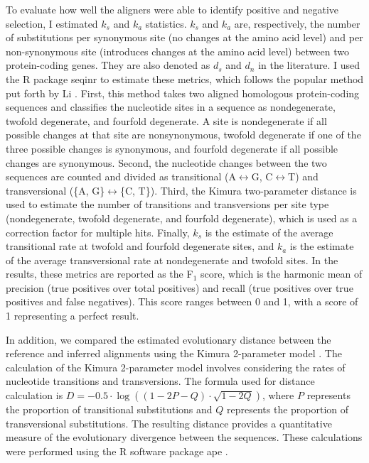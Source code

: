 \documentclass[12pt,letterpaper]{article}
\begin{document}
To evaluate how well the aligners were able to identify positive and negative selection, I estimated $k_s$ and $k_a$ statistics. $k_s$ and $k_a$ are, respectively, the number of substitutions per synonymous site (no changes at the amino acid level) and per non-synonymous site (introduces changes at the amino acid level) between two protein-coding genes. They are also denoted as $d_s$ and $d_n$ in the literature. I used the R package seqinr \citep{seqinr} to estimate these metrics, which follows the popular method put forth by Li \citep{ka_ks_li_1993}. First, this method takes two aligned homologous protein-coding sequences and classifies the nucleotide sites in a sequence as nondegenerate, twofold degenerate, and fourfold degenerate. A site is nondegenerate if all possible changes at that site are nonsynonymous, twofold degenerate if one of the three possible changes is synonymous, and fourfold degenerate if all possible changes are synonymous. Second, the nucleotide changes between the two sequences are counted and divided as transitional (A$\leftrightarrow$G, C$\leftrightarrow$T) and transversional (\{A, G\}$\leftrightarrow$\{C, T\}). Third, the Kimura two-parameter distance \citep{kimura1980simple} is used to estimate the number of transitions and transversions per site type (nondegenerate, twofold degenerate, and fourfold degenerate), which is used as a correction factor for multiple hits. Finally, $k_s$ is the estimate of the average transitional rate at twofold and fourfold degenerate sites, and $k_a$ is the estimate of the average transversional rate at nondegenerate and twofold sites. In the results, these metrics are reported as the F$_1$ score, which is the harmonic mean of precision (true positives over total positives) and recall (true positives over true positives and false negatives). This score ranges between 0 and 1, with a score of 1 representing a perfect result.

In addition, we compared the estimated evolutionary distance between the reference and inferred alignments using the Kimura 2-parameter model \citep{kimura1980simple}. The calculation of the Kimura 2-parameter model involves considering the rates of nucleotide transitions and transversions. The formula used for distance calculation is $D = -0.5 \cdot \log((1 - 2P - Q) \cdot \sqrt{1 - 2Q})$, where $P$ represents the proportion of transitional substitutions and $Q$ represents the proportion of transversional substitutions. The resulting distance provides a quantitative measure of the evolutionary divergence between the sequences. These calculations were performed using the R software package ape \citep{paradis2019ape}.
\end{document}
